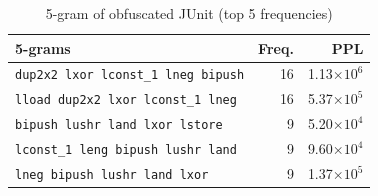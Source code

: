 \documentclass[conference]{IEEEtran}
\begin{document}
\begin{table}[t]
  \centering
  \footnotesize{
    \caption{5-gram of obfuscated JUnit (top 5 frequencies)}\label{table:junit}
  \begin{tabular}{l|r|r}
    \textbf{5-grams} & \textbf{Freq.} & \textbf{PPL}\\ \hline
    \texttt{dup2x2 lxor lconst\_1 lneg bipush}   & 16 & 1.13$\times10^6$ \\
    \texttt{lload dup2x2 lxor lconst\_1 lneg}    & 16 & 5.37$\times10^5$ \\
    \texttt{bipush lushr land lxor lstore}       &  9 & 5.20$\times10^4$ \\
    \texttt{lconst\_1 leng bipush lushr land}    &  9 & 9.60$\times10^4$ \\
    \texttt{lneg bipush lushr land lxor}         &  9 & 1.37$\times10^5$ \\
  \end{tabular}}
\end{table}

\end{document}
